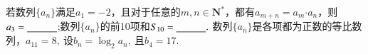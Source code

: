 \documentclass{BHCexam}
\begin{document}
\begin{questions}
\qs 若数列$\{a_n\}$满足$a_1=-2$，且对于任意的$ m,n \in\mathbf{N^*}$，都有$ a_{m+n}=a_m\bm{\cdot}a_n $，则$ a_3=\underline{\hspace{3em}} $;数列$\{a_n\}$的前$ 10 $项和$ S_{10}=\underline{\hspace{3em}}. $
\qs 数列$\{a_n\}$是各项都为正数的等比数列，$ a_{11}=8 ,~$设$ b_n=\log_2a_n,~ $且$ b_4 =17.$






\end{questions}
\end{document}

